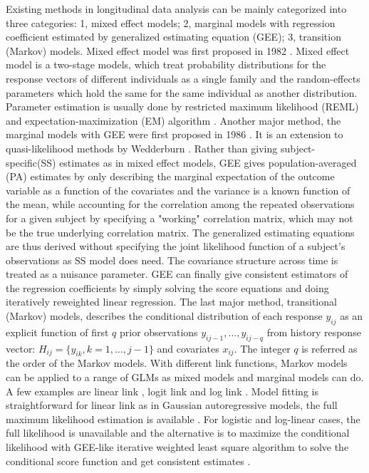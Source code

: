 \documentclass[12pt]{article}
\begin{document}
Existing methods in longitudinal data analysis can be mainly categorized into three categories: 1, mixed effect models; 2, marginal models with regression coefficient estimated by generalized estimating equation (GEE); 3, transition (Markov) models. Mixed effect model was first proposed in 1982 \cite{laird1982random}. Mixed effect model is a two-stage models, which treat probability distributions for the response vectors of different individuals as a single family and the random-effects parameters which hold the same for the same individual as another distribution. Parameter estimation is usually done by restricted maximum likelihood (REML) and expectation-maximization (EM) algorithm \cite{laird1982random}. Another major method, the marginal models with GEE were first proposed in 1986 \cite{zeger1986longitudinal,liang1986longitudinal}. It is an extension to quasi-likelihood methods by Wedderburn \cite{wedderburn1974quasi}. Rather than giving subject-specific(SS) estimates as in mixed effect models, GEE gives population-averaged (PA) estimates by only describing the marginal expectation of the outcome variable as a function of the covariates and the variance is a known function of the mean, while accounting for the correlation among the repeated observations for a given subject by specifying a "working" correlation matrix, which may not be the true underlying correlation matrix. The generalized estimating equations are thus derived without specifying the joint likelihood function of a subject's observations as SS model does need. The covariance structure across time is treated as a nuisance parameter. GEE can finally give consistent estimators of the regression coefficients by simply solving the score equations and doing iteratively reweighted linear regression. The last major method, transitional (Markov) models, describes the conditional distribution of each response $y_{ij}$ as an explicit function of first $q$ prior observations $y_{ij-1},\dots,y_{ij-q}$ from history response vector: $H_{ij} = \{ y_{ik}, k = 1,\dots,j - 1\}$ and covariates $x_{ij}$. The integer $q$ is referred as the order of the Markov models. With different link functions, Markov models can be applied to a range of GLMs as mixed models and marginal models can do. A few examples are linear link \cite{tsay1984regression}, logit link \cite{cox1989analysis,zeger1985analysis,korn1979methods} and log link \cite{zeger1988markov}. Model fitting is straightforward for linear link as in Gaussian autoregressive models, the full maximum likelihood estimation is available \cite{tsay1984regression}. For logistic and log-linear cases, the full likelihood is unavailable and the alternative is to maximize the conditional likelihood with GEE-like iterative weighted least square algorithm to solve the conditional score function and get consistent estimates \cite{cox1989analysis,zeger1985analysis,korn1979methods,zeger1988markov}.
\end{document}

